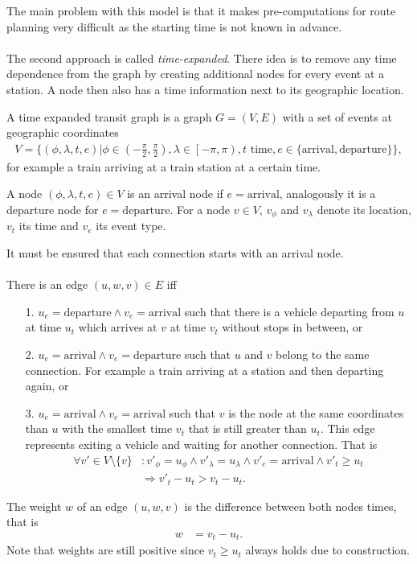 	The main problem with this model is that it makes pre-computations for route planning very difficult as
	the starting time is not known in advance.\\\\
	The second approach is called \textit{time-expanded}. There idea is to remove any time dependence
	from the graph by creating additional nodes for every event at a station. A node then also has a time information
	next to its geographic location.
	\begin{mydef}\label{simpleTransitGraph}
		A \textnormal{time expanded transit graph} is a graph $G = (V, E)$ with a set of events at geographic coordinates
		\begin{align*}
			V = \{(\phi, \lambda, t, e) | \phi \in \left(-\frac{\pi}{2}, \frac{\pi}{2}\right), \lambda \in \left[-\pi, \pi\right),
			t \text{ time}, e \in \{\text{arrival}, \text{departure}\}\},
		\end{align*}
		for example a train arriving at a train station at a certain time.
		
		A node $(\phi, \lambda, t, e) \in V$ is an \textnormal{arrival node} if $e = \text{arrival}$, analogously it is a
		\textnormal{departure node} for $e = \text{departure}$. For a node $v \in V$, $v_\phi$ and $v_\lambda$ denote its location,
		$v_t$  its time and $v_e$ its event type.
		
		It must be ensured that each connection starts with an arrival node.\\\\
		There is an edge $(u, w, v) \in E$ iff
		\begin{itemize}
			\item[1.] $u_e = \text{departure} \land v_e = \text{arrival}$ such that there is a vehicle departing
			from $u$ at time $u_t$ which arrives at $v$ at time $v_t$ without stops in between, or
			\item[2.] $u_e = \text{arrival} \land v_e = \text{departure}$
			such that $u$ and $v$ belong to the same connection. For example a train arriving at a station
			and then departing again, or
			\item[3.] $u_e = \text{arrival} \land v_e = \text{arrival}$
			such that $v$ is the node at the same coordinates than $u$ with the smallest time $v_t$ that is still
			greater than $u_t$. This edge represents exiting a vehicle and waiting for another connection. That is
			\begin{align*}
				\forall v' \in V \setminus \{v\}	&: v'_\phi = u_\phi \land v'_\lambda = u_\lambda \land v'_e = \text{arrival} \land v'_t \ge u_t\\
									&\Rightarrow v'_t - u_t > v_t - u_t.
			\end{align*}
		\end{itemize}
		The weight $w$ of an edge $(u, w, v)$ is the difference between both nodes times, that is
		\begin{align*}
			w	&= v_t - u_t.
		\end{align*}
		Note that weights are still positive since $v_t \ge u_t$ always holds due to construction.
	\end{mydef}
